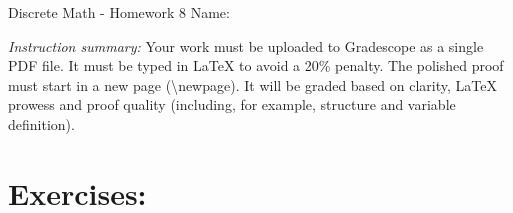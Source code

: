\documentclass[12pt]{article}
\begin{document}
\begin{center}
	{\LARGE Discrete Math - Homework 8} \Large \newline
    Name:
\end{center}

\noindent \emph{Instruction summary:} Your work must be uploaded to Gradescope as a single PDF file. It must be typed in LaTeX to avoid a 20\% penalty. The polished proof must start in a new page (\textbackslash{newpage}). It will be graded based on clarity, LaTeX prowess and proof quality (including, for example, structure and variable definition).

\section*{Exercises:}
\end{document}
